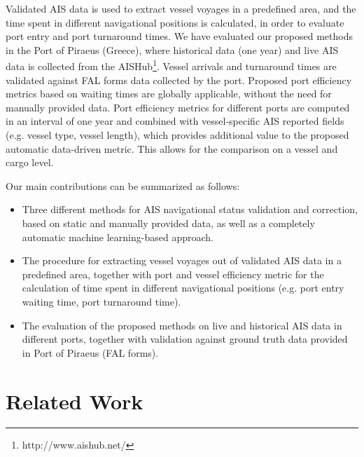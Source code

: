 \documentclass[conference]{IEEEtran}
\begin{document}
Validated AIS data is used to extract vessel voyages in a predefined area, and the time spent in different navigational positions is calculated, in order to evaluate port entry and port turnaround times. We have evaluated our proposed methods in the Port of Piraeus (Greece), where historical data (one year) and live AIS data is collected from the AISHub\footnote{http://www.aishub.net/}. Vessel arrivals and turnaround times are validated against FAL forms data collected by the port. Proposed port efficiency metrics based on waiting times are globally applicable, without the need for manually provided data. Port efficiency metrics for different ports are computed in an interval of one year and combined with vessel-specific AIS reported fields (e.g. vessel type, vessel length), which provides additional value to the proposed automatic data-driven metric. This allows for the comparison on a vessel and cargo level.

Our main contributions can be summarized as follows:

\begin{itemize}  
    \item Three different methods for AIS navigational status validation and correction, based on static and manually provided data, as well as a completely automatic machine learning-based approach.
    
    \item The procedure for extracting vessel voyages out of validated AIS data in a predefined area, together with port and vessel efficiency metric for the calculation of time spent in different navigational positions (e.g. port entry waiting time, port turnaround time).
    
    \item The evaluation of the proposed methods on live and historical AIS data in different ports, together with validation against ground truth data provided in Port of Piraeus (FAL forms).
\end{itemize}

\section{Related Work}
\end{document}
